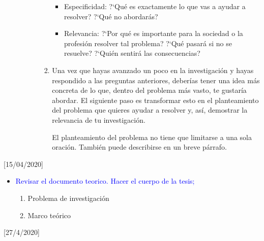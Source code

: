 \documentclass[a4paper,14pt]{article}
\begin{document}
\begin{itemize}
\begin{enumerate}
\begin{itemize}
\begin{enumerate}
\begin{itemize}
\item Especificidad: ?`Qué es exactamente lo que vas a ayudar a resolver? ?`Qué no abordarás?
\item Relevancia: ?`Por qué es importante para la sociedad o la profesión resolver tal problema? ?`Qué pasará si no se resuelve? ?`Quién sentirá las consecuencias?
\end{itemize}
\item Una vez que hayas avanzado un poco en la investigación y hayas respondido a las preguntas anteriores, deberías tener una idea más concreta de lo que, dentro del problema más vasto, te gustaría abordar. El siguiente paso es transformar esto en el planteamiento del problema que quieres ayudar a resolver y, así, demostrar la relevancia de tu investigación.

El planteamiento del problema no tiene que limitarse a una sola oración. También puede describirse en un breve párrafo.
\end{enumerate}
\end{itemize}
\end{enumerate}
\end{itemize}
[15/04/2020]
\begin{itemize}
\item \textcolor{blue}{Revisar el documento teorico. Hacer el cuerpo de la tesis;}
\begin{enumerate}
\item Problema de investigación
\item Marco teórico
\end{enumerate}
\end{itemize}
[27/4/2020]
\end{document}
